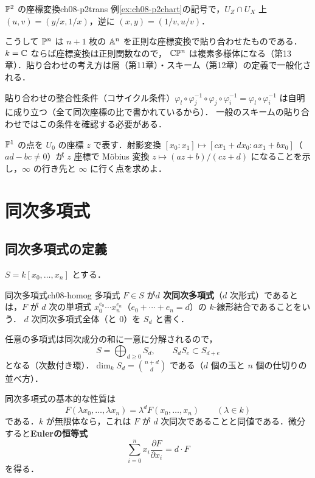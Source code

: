 \begin{myex}{$\mathbb{P}^2$ の座標変換}{ch08-p2trans}
例\ref{ex:ch08-p2chart}の記号で，$U_Z\cap U_X$ 上 $(u,v)=(y/x,1/x)$，逆に $(x,y)=(1/v,u/v)$．
\end{myex}

こうして $\mathbb{P}^n$ は $n+1$ 枚の $\mathbb{A}^n$ を正則な座標変換で貼り合わせたものである．$k=\mathbb{C}$ ならば座標変換は正則関数なので，
$\mathbb{C}\mathbb{P}^n$ は複素多様体になる（第13章）．貼り合わせの考え方は層（第11章）・スキーム（第12章）の定義で一般化される．

\begin{note}
貼り合わせの整合性条件（コサイクル条件）$\varphi_l\circ\varphi_j^{-1}\circ\varphi_j\circ\varphi_i^{-1}=\varphi_l\circ\varphi_i^{-1}$ は自明に成り立つ（全て同次座標の比で書かれているから）．
一般のスキームの貼り合わせではこの条件を確認する必要がある．
\end{note}

$\mathbb{P}^1$ の点を $U_0$ の座標 $z$ で表す．射影変換 $[x_0:x_1]\mapsto[cx_1+dx_0:ax_1+bx_0]$（$ad-bc\neq0$）が $z$ 座標で Möbius 変換 $z\mapsto(az+b)/(cz+d)$ になることを示し，$\infty$ の行き先と $\infty$ に行く点を求めよ．

\section{同次多項式}

\subsection{同次多項式の定義}

$S=k[x_0,\dots,x_n]$ とする．

\begin{mydef}{同次多項式}{ch08-homog}
多項式 $F\in S$ が\textbf{$d$ 次同次多項式}（$d$ 次形式）であるとは，$F$ が $d$ 次の単項式 $x_0^{e_0}\cdots x_n^{e_n}$（$e_0+\cdots+e_n=d$）の $k$-線形結合であることをいう．
$d$ 次同次多項式全体（と $0$）を $S_d$ と書く．
\end{mydef}

任意の多項式は同次成分の和に一意に分解されるので，
\[
  S=\bigoplus_{d\ge0}S_d,\qquad S_dS_e\subset S_{d+e}
\]
となる（次数付き環）．$\dim_kS_d=\binom{n+d}{d}$ である（$d$ 個の玉と $n$ 個の仕切りの並べ方）．

同次多項式の基本的な性質は
\[
  F(\lambda x_0,\dots,\lambda x_n)=\lambda^dF(x_0,\dots,x_n)\qquad(\lambda\in k)
\]
である．$k$ が無限体なら，これは $F$ が $d$ 次同次であることと同値である．微分すると\textbf{Eulerの恒等式}
\[
  \sum_{i=0}^nx_i\frac{\partial F}{\partial x_i}=d\cdot F
\]
を得る．

